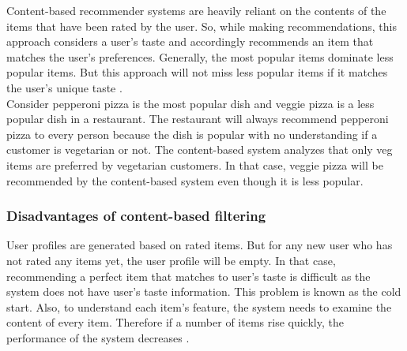 Content-based recommender systems are heavily reliant on the contents of the items that have been rated by the user. So, while making recommendations, this approach considers a user's taste and accordingly recommends an item that matches the user's preferences. Generally, the most popular items dominate less popular items. But this approach will not miss less popular items if it matches the user's unique taste \cite{6}. \\
Consider pepperoni pizza is the most popular dish and veggie pizza is a less popular dish in a restaurant. The restaurant will always recommend pepperoni pizza to every person because the dish is popular with no understanding if a customer is vegetarian or not. The content-based system analyzes that only veg items are preferred by vegetarian customers. In that case, veggie pizza will be recommended by the content-based system even though it is less popular. 
\\
\subsubsection{Disadvantages of content-based filtering}

User profiles are generated based on rated items. But for any new user who has not rated any items yet, the user profile will be empty. In that case, recommending a perfect item that matches to user’s taste is difficult as the system does not have user's taste information. This problem is known as the cold start. Also, to understand each item's feature, the system needs to examine the content of every item. Therefore if a number of items rise quickly, the performance of the system decreases \cite{6}.\\

